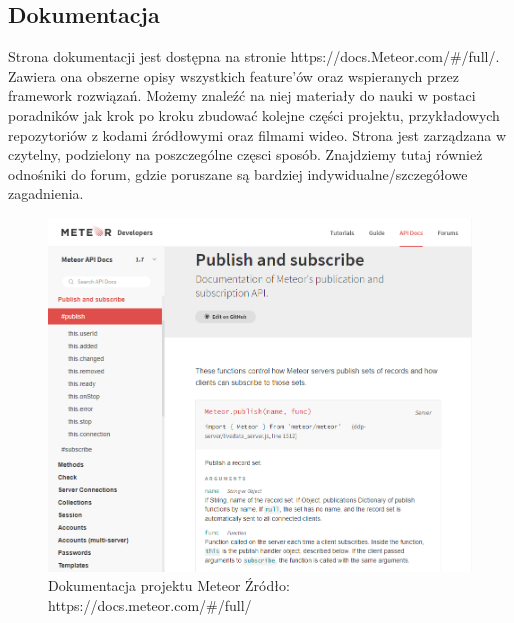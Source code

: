 \documentclass[12pt]{report}
\begin{document}
    \subsection{Dokumentacja}
      Strona dokumentacji jest dostępna na stronie https://docs.Meteor.com/\#/full/.
      Zawiera ona obszerne opisy wszystkich feature'ów oraz wspieranych przez framework rozwiązań.
      Możemy znaleźć na niej materiały do nauki w postaci poradników jak krok po kroku zbudować kolejne części projektu, przykładowych repozytoriów z kodami źródłowymi oraz filmami wideo.
      Strona jest zarządzana w czytelny, podzielony na poszczególne częsci sposób.
      Znajdziemy tutaj również odnośniki do forum, gdzie poruszane są bardziej indywidualne/szczegółowe zagadnienia.
      \begin{figure}[!hb]
        \centering
        \includegraphics[width=\textwidth,height=\textheight,keepaspectratio]{doc_meteor.png} 
        \caption{Dokumentacja projektu Meteor \newline Źródło: https://docs.meteor.com/\#/full/}
      \end{figure}
\end{document}

